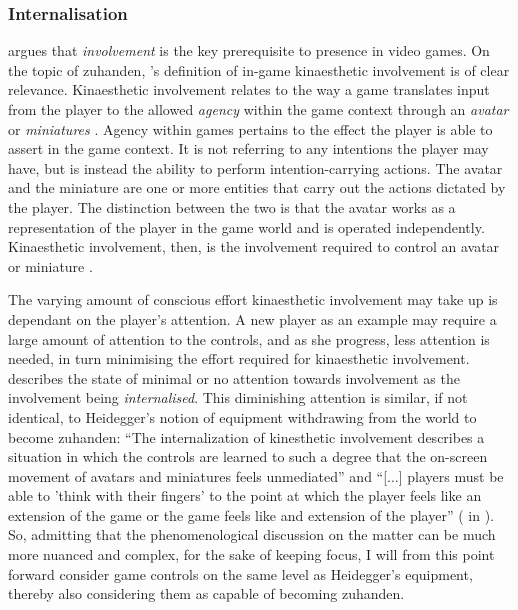 \subsubsection{Internalisation}
 argues that \textit{involvement} is the key prerequisite to presence in video games. On the topic of zuhanden, \citeauthor{calleja}'s \citeyear{calleja} definition of in-game kinaesthetic involvement is of clear relevance. Kinaesthetic involvement relates to the way a game translates input from the player to the allowed \textit{agency} within the game context through an \textit{avatar} or \textit{miniatures} \cite{calleja}. Agency within games pertains to the effect the player is able to assert in the game context. It is not referring to any intentions the player may have, but is instead the ability to perform intention-carrying actions. The avatar and the miniature are one or more entities that carry out the actions dictated by the player. The distinction between the two is that the avatar works as a representation of the player in the game world and is operated independently. Kinaesthetic involvement, then, is the involvement required to control an avatar or miniature \cite{calleja}.

The varying amount of conscious effort kinaesthetic involvement may take up is dependant on the player's attention. A new player as an example may require a large amount of attention to the controls, and as she progress, less attention is needed, in turn minimising the effort required for kinaesthetic involvement.  describes the state of minimal or no attention towards involvement as the involvement being \textit{internalised}. This diminishing attention is similar, if not identical, to Heidegger's notion of equipment withdrawing from the world to become zuhanden: ``The internalization of kinesthetic involvement describes a situation in which the controls are learned to such a degree that the on-screen movement of avatars and miniatures feels unmediated'' \cite[p. 68]{calleja} and ``[...] players must be able to 'think with their fingers' to the point at which the player feels like an extension of the game or the game feels like and extension of the player'' ( in ). So, admitting that the phenomenological discussion on the matter can be much more nuanced and complex, for the sake of keeping focus, I will from this point forward consider game controls on the same level as Heidegger's equipment, thereby also considering them as capable of becoming zuhanden.

